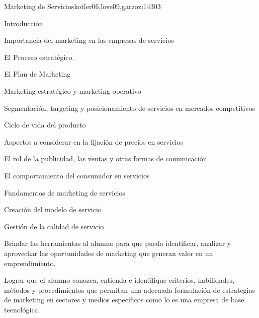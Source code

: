 \begin{syllabus}
   \begin{unit}{Marketing de Servicios}{}{kotler06,love09,garzozi14}{30}{3}
   \begin{topics}
         \item Introducción
         \item Importancia del marketing en las empresas de servicios
         \item El Proceso estratégico.
         \item El Plan de Marketing
         \item Marketing estratégico y marketing operativo
         \item Segmentación, targeting y posicionamiento de servicios en mercados competitivos
         \item Ciclo de vida del producto
          \item Aspectos a considerar en la fijación de precios en servicios
          \item El rol de la publicidad, las ventas y otras formas de comunicación
         \item El comportamiento del consumidor en servicios
         \item Fundamentos de marketing de servicios
         \item Creación del modelo de servicio
         \item Gestión de la calidad de servicio
      \end{topics}
      \begin{learningoutcomes}
         \item Brindar las herramientas al alumno para que pueda identificar, analizar y aprovechar las oportunidades de marketing que generan valor en un emprendimiento.
         \item Lograr que el alumno conozca, entienda e identifique criterios, habilidades, métodos y procedimientos que permitan una adecuada formulación de estrategias de marketing en sectores y medios específicos como lo es una empresa de base tecnológica.
      \end{learningoutcomes}
   \end{unit}
   

\end{syllabus}
